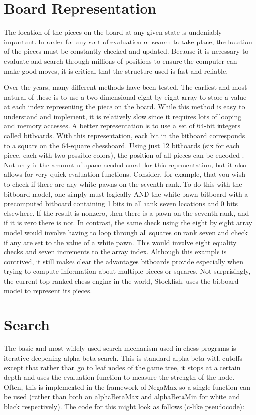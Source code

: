 \documentclass[11pt]{article}
\begin{document}
\section{Board Representation}
The location of the pieces on the board at any given state is undeniably important. In order for any sort of evaluation or search to take place, the location of the pieces must be constantly checked and updated. Because it is necessary to evaluate and search through millions of positions to ensure the computer can make good moves, it is critical that the structure used is fast and reliable. 

Over the years, many different methods have been tested. The earliest and most natural of these is to use a two-dimensional eight by eight array to store a value at each index representing the piece on the board. While this method is easy to understand and implement, it is relatively slow since it requires lots of looping and memory accesses\cite{bovskovic2005representation}. A better representation is to use a set of 64-bit integers called bitboards. With this representation, each bit in the bitboard corresponds to a square on the 64-square chessboard. Using just 12 bitboards (six for each piece, each with two possible colors), the position of all pieces can be encoded \cite{segundo2006efficient}. Not only is the amount of space needed small for this representation, but it also allows for very quick evaluation functions. Consider, for example, that you wish to check if there are any white pawns on the seventh rank. To do this with the bitboard model, one simply must logically AND the white pawn bitboard with a precomputed bitboard containing 1 bits in all rank seven locations and 0 bits elsewhere. If the result is nonzero, then there is a pawn on the seventh rank, and if it is zero there is not. In contrast, the same check using the eight by eight array model would involve having to loop through all squares on rank seven and check if any are set to the value of a white pawn. This would involve eight equality checks and seven increments to the array index. Although this example is contrived, it still makes clear the advantages bitboards provide especially when trying to compute information about multiple pieces or squares. Not surprisingly, the current top-ranked chess engine in the world, Stockfish, uses the bitboard model to represent its pieces.

\section{Search} %
The basic and most widely used search mechanism used in chess programs is iterative deepening alpha-beta search\cite{reinefeld1983improvement}. This is standard alpha-beta with cutoffs except that rather than go to leaf nodes of the game tree, it stops at a certain depth and uses the evaluation function to measure the strength of the node.  Often, this is implemented in the framework of NegaMax so a single function can be used (rather than both an alphaBetaMax and alphaBetaMin for white and black respectively)\cite{boule2002fpga}. The code for this might look as follows (c-like pseudocode):
\end{document}
